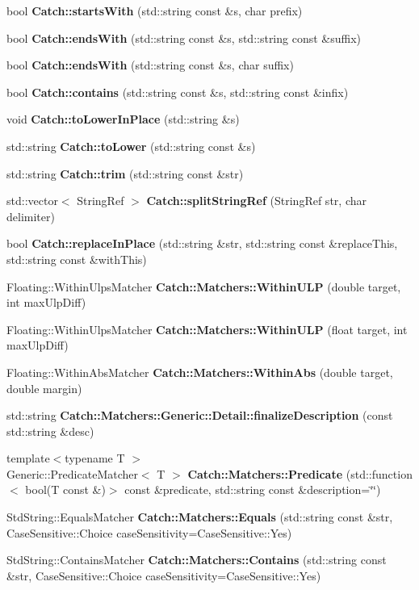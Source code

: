 \begin{DoxyCompactItemize}
\item 
bool \textbf{ Catch\+::starts\+With} (std\+::string const \&s, char prefix)
\item 
bool \textbf{ Catch\+::ends\+With} (std\+::string const \&s, std\+::string const \&suffix)
\item 
bool \textbf{ Catch\+::ends\+With} (std\+::string const \&s, char suffix)
\item 
bool \textbf{ Catch\+::contains} (std\+::string const \&s, std\+::string const \&infix)
\item 
void \textbf{ Catch\+::to\+Lower\+In\+Place} (std\+::string \&s)
\item 
std\+::string \textbf{ Catch\+::to\+Lower} (std\+::string const \&s)
\item 
std\+::string \textbf{ Catch\+::trim} (std\+::string const \&str)
\item 
std\+::vector$<$ String\+Ref $>$ \textbf{ Catch\+::split\+String\+Ref} (String\+Ref str, char delimiter)
\item 
bool \textbf{ Catch\+::replace\+In\+Place} (std\+::string \&str, std\+::string const \&replace\+This, std\+::string const \&with\+This)
\item 
Floating\+::\+Within\+Ulps\+Matcher \textbf{ Catch\+::\+Matchers\+::\+Within\+U\+LP} (double target, int max\+Ulp\+Diff)
\item 
Floating\+::\+Within\+Ulps\+Matcher \textbf{ Catch\+::\+Matchers\+::\+Within\+U\+LP} (float target, int max\+Ulp\+Diff)
\item 
Floating\+::\+Within\+Abs\+Matcher \textbf{ Catch\+::\+Matchers\+::\+Within\+Abs} (double target, double margin)
\item 
std\+::string \textbf{ Catch\+::\+Matchers\+::\+Generic\+::\+Detail\+::finalize\+Description} (const std\+::string \&desc)
\item 
{\footnotesize template$<$typename T $>$ }\\Generic\+::\+Predicate\+Matcher$<$ T $>$ \textbf{ Catch\+::\+Matchers\+::\+Predicate} (std\+::function$<$ bool(T const \&)$>$ const \&predicate, std\+::string const \&description=\char`\"{}\char`\"{})
\item 
Std\+String\+::\+Equals\+Matcher \textbf{ Catch\+::\+Matchers\+::\+Equals} (std\+::string const \&str, Case\+Sensitive\+::\+Choice case\+Sensitivity=Case\+Sensitive\+::\+Yes)
\item 
Std\+String\+::\+Contains\+Matcher \textbf{ Catch\+::\+Matchers\+::\+Contains} (std\+::string const \&str, Case\+Sensitive\+::\+Choice case\+Sensitivity=Case\+Sensitive\+::\+Yes)

\end{DoxyCompactItemize}
